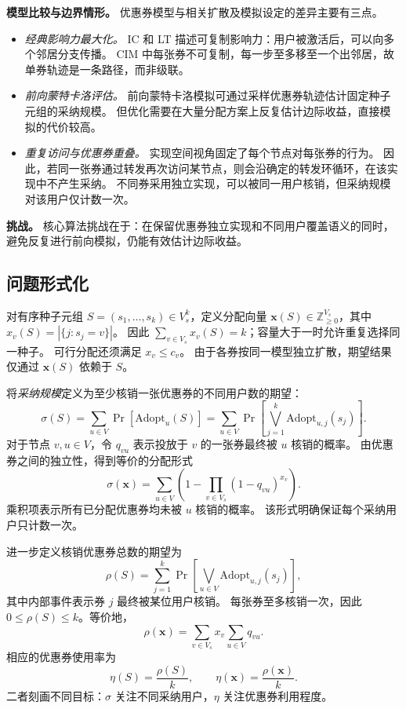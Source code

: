 \documentclass[sigconf,balance=false]{acmart}
\begin{document}
\textbf{模型比较与边界情形。}
优惠券模型与相关扩散及模拟设定的差异主要有三点。
\begin{itemize}
  \item \emph{经典影响力最大化。}
  IC 和 LT 描述可复制影响力：用户被激活后，可以向多个邻居分支传播。
  CIM 中每张券不可复制，每一步至多移至一个出邻居，故单券轨迹是一条路径，而非级联。

\item \emph{前向蒙特卡洛评估。}
  前向蒙特卡洛模拟可通过采样优惠券轨迹估计固定种子元组的采纳规模。
  但优化需要在大量分配方案上反复估计边际收益，直接模拟的代价较高。

\item \emph{重复访问与优惠券重叠。}
  实现空间视角固定了每个节点对每张券的行为。
  因此，若同一张券通过转发再次访问某节点，则会沿确定的转发环循环，在该实现中不产生采纳。
  不同券采用独立实现，可以被同一用户核销，但采纳规模对该用户仅计数一次。
\end{itemize}

\textbf{挑战。}
核心算法挑战在于：在保留优惠券独立实现和不同用户覆盖语义的同时，避免反复进行前向模拟，仍能有效估计边际收益。

\subsection{问题形式化}

对有序种子元组 $S=(s_1,\ldots,s_k)\in V_s^k$，定义分配向量 $\bm{x}(S)\in\mathbb{Z}_{\geq 0}^{V_s}$，其中 $x_v(S)=|\{j:s_j=v\}|$。
因此 $\sum_{v\in V_s}x_v(S)=k$；容量大于一时允许重复选择同一种子。
可行分配还须满足 $x_v\leq c_v$。
由于各券按同一模型独立扩散，期望结果仅通过 $\bm{x}(S)$ 依赖于 $S$。

将\emph{采纳规模}定义为至少核销一张优惠券的不同用户数的期望：
\[
  \sigma(S) = \sum_{u \in V}
    \Pr\!\left[\mathrm{Adopt}_u(S)\right]
  = \sum_{u \in V}
    \Pr\!\left[\bigvee_{j=1}^{k} \mathrm{Adopt}_{u,j}(s_j)\right].
\]
对于节点 $v,u\in V$，令 $q_{vu}$ 表示投放于 $v$ 的一张券最终被 $u$ 核销的概率。
由优惠券之间的独立性，得到等价的分配形式
\[
  \sigma(\bm{x})=
  \sum_{u\in V}\left(1-\prod_{v\in V_s}(1-q_{vu})^{x_v}\right).
\]
乘积项表示所有已分配优惠券均未被 $u$ 核销的概率。
该形式明确保证每个采纳用户只计数一次。

进一步定义核销优惠券总数的期望为
\[
  \rho(S) =
  \sum_{j=1}^{k}
    \Pr\!\left[\bigvee_{u\in V} \mathrm{Adopt}_{u,j}(s_j)\right],
\]
其中内部事件表示券 $j$ 最终被某位用户核销。
每张券至多核销一次，因此 $0\leq\rho(S)\leq k$。等价地，
\[
  \rho(\bm{x})=\sum_{v\in V_s}x_v\sum_{u\in V}q_{vu}.
\]
相应的优惠券使用率为
\[
  \eta(S)=\frac{\rho(S)}{k},
  \qquad
  \eta(\bm{x})=\frac{\rho(\bm{x})}{k}.
\]
二者刻画不同目标：$\sigma$ 关注不同采纳用户，$\eta$ 关注优惠券利用程度。
\end{document}
